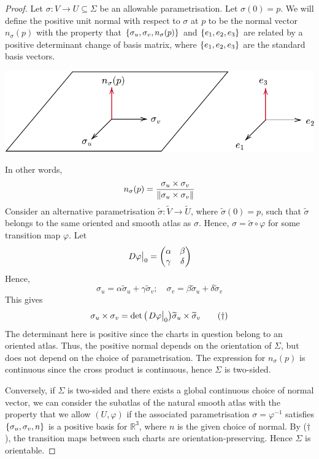 \documentclass[a4paper,11pt]{article}
\begin{document}
\begin{proof}
	Let \( \sigma \colon V \to U \subseteq \Sigma \) be an allowable parametrisation.
	Let \( \sigma(0) = p \).
	We will define the positive unit normal with respect to \( \sigma \) at \( p \) to be the normal vector \( n_\sigma(p) \) with the property that \( \qty{\sigma_u, \sigma_v, n_\sigma(p)} \) and \( \qty{e_1, e_2, e_3} \) are related by a positive determinant change of basis matrix, where \( \qty{e_1, e_2, e_3} \) are the standard basis vectors.
	\begin{center}
		\includegraphics[scale=.8]{orientable-lemma}
	\end{center}
	In other words,
	\[
		n_\sigma(p) = \frac{\sigma_u \times \sigma_v}{\norm{\sigma_u \times \sigma_v}}
	\]
	Consider an alternative parametrisation \( \widetilde \sigma \colon \widetilde V \to \widetilde U \), where \( \widetilde \sigma(0) = p \), such that \( \widetilde \sigma \) belongs to the same oriented and smooth atlas as \( \sigma \).
	Hence, \( \sigma = \widetilde \sigma \circ \varphi \) for some transition map \( \varphi \).
	Let
	\[
		{\textstyle \eval{D \varphi}_0} = \begin{pmatrix}
			\alpha & \beta  \\
			\gamma & \delta
		\end{pmatrix}
	\]
	Hence,
	\[
		\sigma_u = \alpha \widetilde \sigma_u + \gamma \widetilde \sigma_v;\quad \sigma_v = \beta \widetilde \sigma_u + \delta \widetilde \sigma_v
	\]
	This gives
	\begin{equation}
		\sigma_u \times \sigma_v = \det\qty({\textstyle \eval{D  \varphi}_0}) \widetilde \sigma_u \times \widetilde \sigma_v \tag{\(\dagger\)}
	\end{equation}
	The determinant here is positive since the charts in question belong to an oriented atlas.
	Thus, the positive normal depends on the orientation of \( \Sigma \), but does not depend on the choice of parametrisation.
	The expression for \( n_\sigma(p) \) is continuous since the cross product is continuous, hence \( \Sigma \) is two-sided.

	Conversely, if \( \Sigma \) is two-sided and there exists a global continuous choice of normal vector, we can consider the subatlas of the natural smooth atlas with the property that we allow \( (U,\varphi) \) if the associated parametrisation \( \sigma = \varphi^{-1} \) satisfies \( \qty{\sigma_u, \sigma_v, n} \) is a positive basis for \( \mathbb R^3 \), where \( n \) is the given choice of normal.
	By (\(\dagger\)), the transition maps between such charts are orientation-preserving.
	Hence \( \Sigma \) is orientable.
\end{proof}
\end{document}
